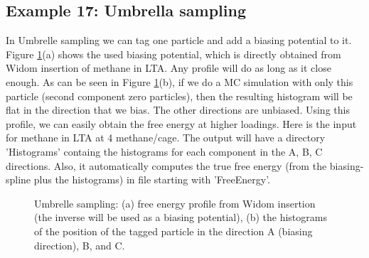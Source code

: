 \subsection*{Example 17: Umbrella sampling}

In Umbrelle sampling we can tag one particle and add a biasing potential to it. Figure \ref{Fig: umbrealla sampling}(a)
shows the used biasing potential, which is directly obtained from Widom insertion of methane in LTA. Any profile will
do as long as it close enough. 
As can be seen in Figure \ref{Fig: umbrealla sampling}(b), if we do a MC simulation
with only this particle (second component zero particles), 
then the resulting histogram will be flat in the direction that we bias. The other directions are unbiased.
Using this profile, we can easily obtain the free energy at higher loadings. Here is the input for methane in LTA at 4 methane/cage.
The output will have a directory 'Histograms' containg the histograms for each component in the A, B, C directions. Also, it automatically
computes the true free energy (from the biasing-spline plus the histograms) in file starting with 'FreeEnergy'.

\begin{figure}[t]
  \centering
  \caption{Umbrelle sampling: (a) free energy profile from Widom insertion (the inverse will be used as a biasing potential),
           (b) the histograms of the position of the tagged particle in the direction A (biasing direction), B, and C.}
  \label{Fig: umbrealla sampling}
\end{figure}

